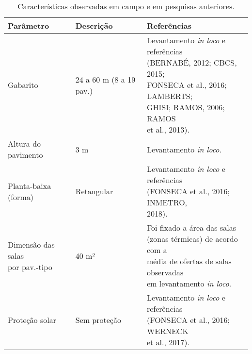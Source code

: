 \begin{table}[ht]\centering
    \caption{\small Características observadas em campo e em pesquisas anteriores.}
    \vspace*{0.2cm}
    \label{tab:tabela1}
    \begin{tabular*}{\columnwidth}{@{\extracolsep{\fill}}lll}
    \hline
    \textbf{Parâmetro}                                             & \textbf{Descrição}                                                                    & \textbf{Referências} \\ \hline
    Gabarito                                                       & 24 a 60 m (8 a 19 pav.)                                                               & \makecell[l]{Levantamento \textit{in loco} e referências\\ (BERNABÉ, 2012; CBCS, 2015; \\FONSECA et al., 2016; LAMBERTS; \\GHISI; RAMOS, 2006; RAMOS \\et al., 2013).} \\ \hline
    Altura do pavimento                                            & 3 m                                                                                   & Levantamento \textit{in loco}.                                                                                                                                         \\ \hline
    Planta-baixa (forma)                                           & Retangular                                                                            & \makecell[l]{Levantamento \textit{in loco} e referências\\ (FONSECA et al., 2016; INMETRO,\\ 2018).}                                                                   \\ \hline
    \makecell[l]{Dimensão das salas\\ por pav.-tipo}               & 40 m²                                                                                 & \makecell[l]{Foi fixado a área das salas \\(zonas térmicas) de acordo com a \\média de ofertas de salas observadas\\ em levantamento \textit{in loco}.}                  \\ \hline
    Proteção solar                                                 & Sem proteção                                                                          & \makecell[l]{Levantamento \textit{in loco} e referências\\ (FONSECA et al., 2016; WERNECK \\et al., 2017).}                                                            \\ \hline

\end{tabular*}
\end{table}
